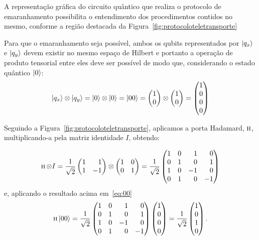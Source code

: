 A representação gráfica do circuito quântico que realiza o protocolo de emaranhamento possibilita o entendimento dos procedimentos contidos no mesmo, conforme a região destacada da Figura~\ref{fig:protocoloteletransporte}

Para que o emaranhamento seja possível, ambos os qubits representados por $\ket{q_x}$ e $\ket{q_y}$ devem existir no mesmo espaço de Hilbert e portanto a operação de produto tensorial entre eles deve ser possível de modo que, considerando o estado quântico $\ket{0}$:
\begin{equation}
\ket{q_x} \otimes \ket{q_y} = \ket{0} \otimes \ket{0} = \ket{00} = \begin{pmatrix}
1 \\
0
\end{pmatrix} \otimes \begin{pmatrix}
1 \\
0
\end{pmatrix} = \begin{pmatrix}
1 \\
0 \\
0 \\
0
\end{pmatrix}
\end{equation}

Seguindo a Figura~\ref{fig:protocoloteletransporte}, aplicamos a porta Hadamard, \(\operatorname{\textsc{h}}\), multiplicando-a pela matriz identidade \(I\), obtendo:

\begin{equation}
\HAD \otimes I = \frac{1}{\sqrt{2}} \begin{pmatrix*}[r]
1 & 1 \\
1 & -1
\end{pmatrix*} \otimes \begin{pmatrix}
1 & 0 \\
0 & 1
\end{pmatrix} = \frac{1}{\sqrt{2}} \begin{pmatrix*}[r]
1 & 0 & 1 & 0 \\
0 & 1 & 0 & 1 \\
1 & 0 & -1 & 0 \\
0 & 1 & 0 & -1
\end{pmatrix*}
\end{equation}
e, aplicando o resultado acima em~\eqref{eq:00}
\begin{equation}
\HAD \ket{00} = \frac{1}{\sqrt{2}} \begin{pmatrix*}[r]
1 & 0 & 1 & 0 \\
0 & 1 & 0 & 1 \\
1 & 0 & -1 & 0 \\
0 & 1 & 0 & -1
\end{pmatrix*} \begin{pmatrix}
1 \\
0 \\
0 \\
0
\end{pmatrix} = \frac{1}{\sqrt{2}} \begin{pmatrix}
1 \\
0 \\
1 \\
0
\end{pmatrix}.
\end{equation}

